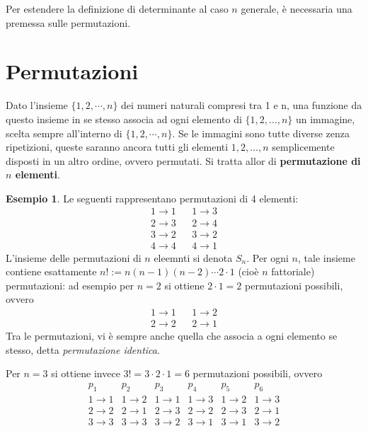 \documentclass{book}
\theoremstyle{definition}
\newtheorem{es}{Esempio}[section]
\theoremstyle{plain}
\begin{document}
Per estendere la definizione di determinante al caso $n$ generale, è necessaria una
premessa sulle permutazioni.

\section{Permutazioni}
\label{sec:perm}

Dato l'insieme $\{1,2,\cdots, n\}$ dei numeri naturali compresi tra 1 e n, una
funzione da questo insieme in se stesso associa ad ogni elemento di $\{1,2,\dots,n\}$
un immagine, scelta sempre all'interno di $\{1,2,\cdots,n\}$. Se le immagini sono
tutte diverse zenza ripetizioni, queste saranno ancora tutti gli elementi
$1,2,\dots,n$ semplicemente disposti in un altro ordine, ovvero permutati. Si tratta
allor di \textbf{permutazione di $n$ elementi}.
\begin{es}
  \label{es:perm1}
  Le seguenti rappresentano permutazioni di 4 elementi:
  \begin{eqnarray*}
    1 \to 1 && 1 \to 3\\
    2 \to 3 && 2 \to 4\\
    3 \to 2 && 3 \to 2\\
    4 \to 4 && 4 \to 1
  \end{eqnarray*}
  L'insieme delle permutazioni di $n$ eleemnti si denota $S_n$. Per ogni $n$, tale
  insieme contiene esattamente $n!:= n(n-1)(n-2)\cdots 2 \cdot 1$ (cioè $n$
  fattoriale) permutazioni: ad esempio per $n=2$ si ottiene $2\cdot 1=2$ permutazioni
  possibili, ovvero
  \begin{equation*}
    \begin{matrix}
      1\to 1 && 1\to 2\\
      2\to 2 && 2\to 1
    \end{matrix}
  \end{equation*}
  Tra le permutazioni, vi è sempre anche quella che associa a ogni elemento se stesso,
  detta \textit{permutazione identica}.
\end{es}
Per $n=3$ si ottiene invece $3! = 3\cdot 2\cdot 1 = 6$ permutazioni possibili,
ovvero
\begin{equation*}
  \begin{matrix}
    p_1 & p_2 & p_3 & p_4 & p_5 & p_6\\
    1 \to 1 & 1 \to 2 & 1 \to 1 & 1 \to 3 & 1 \to 2 & 1 \to 3 \\
    2 \to 2 & 2 \to 1 & 2 \to 3 & 2 \to 2 & 2 \to 3 & 2 \to 1 \\
    3 \to 3 & 3 \to 3 & 3 \to 2 & 3 \to 1 & 3 \to 1 & 3 \to 2
  \end{matrix}
\end{equation*}
\end{document}
